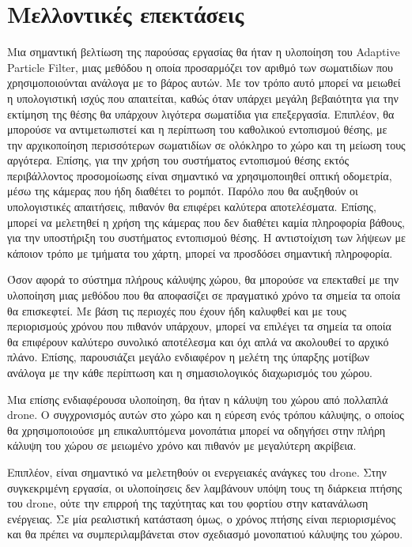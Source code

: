 \chapter{Μελλοντικές επεκτάσεις}
\label{chapter:future_work}

Μια σημαντική βελτίωση της παρούσας εργασίας θα ήταν η υλοποίηση του Adaptive Particle Filter, μιας μεθόδου η οποία προσαρμόζει τον αριθμό των σωματιδίων που χρησιμοποιούνται ανάλογα με το βάρος αυτών. Με τον τρόπο αυτό μπορεί να μειωθεί η υπολογιστική ισχύς που απαιτείται, καθώς όταν υπάρχει μεγάλη βεβαιότητα για την εκτίμηση της θέσης θα υπάρχουν λιγότερα σωματίδια για επεξεργασία. Επιπλέον, θα μπορούσε να αντιμετωπιστεί και η περίπτωση του καθολικού εντοπισμού θέσης, με την αρχικοποίηση περισσότερων σωματιδίων σε ολόκληρο το χώρο και τη μείωση τους αργότερα. Επίσης, για την χρήση του συστήματος εντοπισμού θέσης εκτός περιβάλλοντος προσομοίωσης είναι σημαντικό να χρησιμοποιηθεί οπτική οδομετρία, μέσω της κάμερας που ήδη διαθέτει το ρομπότ. Παρόλο που θα αυξηθούν οι υπολογιστικές απαιτήσεις, πιθανόν θα επιφέρει καλύτερα αποτελέσματα. Επίσης, μπορεί να μελετηθεί η χρήση της κάμερας που δεν διαθέτει καμία πληροφορία βάθους, για την υποστήριξη του συστήματος εντοπισμού θέσης. Η αντιστοίχιση των λήψεων με κάποιον τρόπο με τμήματα του χάρτη, μπορεί να προσδόσει σημαντική πληροφορία.

Όσον αφορά το σύστημα πλήρους κάλυψης χώρου, θα μπορούσε να επεκταθεί με την υλοποίηση μιας μεθόδου που θα αποφασίζει σε πραγματικό χρόνο τα σημεία τα οποία θα επισκεφτεί. Με βάση τις περιοχές που έχουν ήδη καλυφθεί και με τους περιορισμούς χρόνου που πιθανόν υπάρχουν, μπορεί να επιλέγει τα σημεία τα οποία θα επιφέρουν καλύτερο συνολικό αποτέλεσμα και όχι απλά να ακολουθεί το αρχικό πλάνο. Επίσης, παρουσιάζει μεγάλο ενδιαφέρον η μελέτη της ύπαρξης μοτίβων ανάλογα με την κάθε περίπτωση και η σημασιολογικός διαχωρισμός του χώρου.

Μια επίσης ενδιαφέρουσα υλοποίηση, θα ήταν η κάλυψη του χώρου από πολλαπλά drone. Ο συγχρονισμός αυτών στο χώρο και η εύρεση ενός τρόπου κάλυψης, ο οποίος θα χρησιμοποιούσε μη επικαλυπτόμενα μονοπάτια μπορεί να οδηγήσει στην πλήρη κάλυψη του χώρου σε μειωμένο χρόνο και πιθανόν με μεγαλύτερη ακρίβεια. 

Επιπλέον, είναι σημαντικό να μελετηθούν οι ενεργειακές ανάγκες του drone. Στην συγκεκριμένη εργασία, οι υλοποίησεις δεν λαμβάνουν υπόψη τους τη διάρκεια πτήσης του drone, ούτε την επιρροή της ταχύτητας και του φορτίου στην κατανάλωση ενέργειας. Σε μία ρεαλιστική κατάσταση όμως, ο χρόνος πτήσης είναι περιορισμένος και θα πρέπει να συμπεριλαμβάνεται στον σχεδιασμό μονοπατιού κάλυψης του χώρου. 